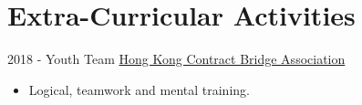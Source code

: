 \documentclass[letterpaper]{twentysecondcv} %
\begin{document}
\section{Extra-Curricular Activities}{\Large \faTrophy}
\vspace{-0.25cm}
\begin{twenty}
	\twentyitemshorttest
			{2018 - }
			{}
			{Youth Team}
			{\href{http://www.hkcba.org}{Hong Kong Contract Bridge Association}}
			{}
			{\vspace{-2mm}\begin{itemize}[topsep=0pt,partopsep=0pt]
			 \item Logical, teamwork and mental training.
			\end{itemize}} \\

\end{twenty}
\end{document}
